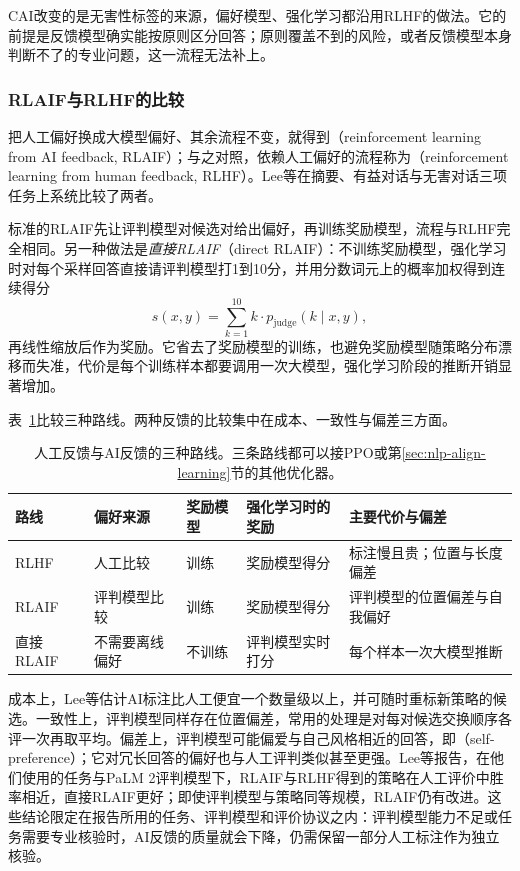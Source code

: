 CAI改变的是无害性标签的来源，偏好模型、强化学习都沿用RLHF的做法。它的前提是反馈模型确实能按原则区分回答；原则覆盖不到的风险，或者反馈模型本身判断不了的专业问题，这一流程无法补上。

\subsubsection{RLAIF与RLHF的比较}
\label{sec:nlp-align-rlaif}

把人工偏好换成大模型偏好、其余流程不变，就得到（reinforcement learning from AI feedback, RLAIF）；与之对照，依赖人工偏好的流程称为（reinforcement learning from human feedback, RLHF）。Lee等在摘要、有益对话与无害对话三项任务上系统比较了两者。

标准的RLAIF先让评判模型对候选对给出偏好，再训练奖励模型，流程与RLHF完全相同。另一种做法是\emph{直接RLAIF}（direct RLAIF）：不训练奖励模型，强化学习时对每个采样回答直接请评判模型打1到10分，并用分数词元上的概率加权得到连续得分
\[
 s(x,y)=\sum_{k=1}^{10}k\cdot p_{\mathrm{judge}}(k\mid x,y),
\]
再线性缩放后作为奖励。它省去了奖励模型的训练，也避免奖励模型随策略分布漂移而失准，代价是每个训练样本都要调用一次大模型，强化学习阶段的推断开销显著增加。

表~\ref{tab:nlp-align-feedback-sources}比较三种路线。两种反馈的比较集中在成本、一致性与偏差三方面。

\begin{table}[htbp]
  \centering
  \small
  \caption{人工反馈与AI反馈的三种路线。三条路线都可以接PPO或第\ref{sec:nlp-align-learning}节的其他优化器。}
  \label{tab:nlp-align-feedback-sources}
  \begin{tabularx}{\linewidth}{@{}lp{30mm}p{22mm}p{30mm}X@{}}
    \toprule
    路线 & 偏好来源 & 奖励模型 & 强化学习时的奖励 & 主要代价与偏差\\
    \midrule
    RLHF & 人工比较 & 训练 & 奖励模型得分 & 标注慢且贵；位置与长度偏差\\
    RLAIF & 评判模型比较 & 训练 & 奖励模型得分 & 评判模型的位置偏差与自我偏好\\
    直接RLAIF & 不需要离线偏好 & 不训练 & 评判模型实时打分 & 每个样本一次大模型推断\\
    \bottomrule
  \end{tabularx}
\end{table}
成本上，Lee等估计AI标注比人工便宜一个数量级以上，并可随时重标新策略的候选。一致性上，评判模型同样存在位置偏差，常用的处理是对每对候选交换顺序各评一次再取平均。偏差上，评判模型可能偏爱与自己风格相近的回答，即（self-preference）；它对冗长回答的偏好也与人工评判类似甚至更强。Lee等报告，在他们使用的任务与PaLM 2评判模型下，RLAIF与RLHF得到的策略在人工评价中胜率相近，直接RLAIF更好；即使评判模型与策略同等规模，RLAIF仍有改进。这些结论限定在报告所用的任务、评判模型和评价协议之内：评判模型能力不足或任务需要专业核验时，AI反馈的质量就会下降，仍需保留一部分人工标注作为独立核验。

